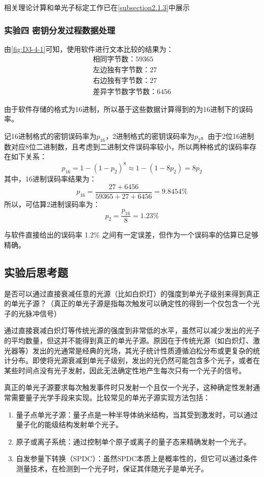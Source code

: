 \documentclass[dvipsnames, svgnames,a4paper,11pt]{article}
\begin{document}
		相关理论计算和单光子标定工作已在\cref{subsection2.1.3}中展示



	\subsubsection{实验四 \quad 密钥分发过程数据处理}


		由\cref{fig:D3-4-1}可知，使用软件进行文本比较的结果为：
			\begin{align}
				\text{相同字节数：} 59365	\nonumber\\
				\text{左边独有字节数：} 27	\nonumber\\
				\text{右边独有字节数：} 27	\nonumber\\
				\text{差异字节数字节数：} 6456	\nonumber
			\end{align}
			
		由于软件存储的格式为16进制，所以基于这些数据计算得到的为16进制下的误码率。

		记16进制格式的密钥误码率为$p_{16}$，2进制格式的密钥误码率为$p_{2}$。由于2位16进制数对应8位二进制数，且考虑到二进制文件误码率较小，所以两种格式的误码率存在如下关系：
		\[
			p_{16} = 1 - (1 - p_{2})^8 \approx 1 - (1 - 8p_{2}) = 8p_{2}
		\]
		其中，16进制误码率结果为：
		\[
			p_{16} = \frac{27 + 6456}{59365 + 27 + 6456} = 9.8454 \%
		\]
		所以，可估算2进制误码率为：
		\[
			p_{2} = \frac{p_{16}}{8} = 1.23 \%
		\]

		与软件直接给出的误码率 1.2\% 之间有一定误差，但作为一个误码率的估算已足够精确。

	
\subsection{实验后思考题}

\begin{question}
	是否可以通过直接衰减任意的光源（比如白炽灯）的强度到单光子级别来得到真正的单光子源？（真正的单光子源是指每次触发可以确定性的得到一个仅包含一个光子的光脉冲信号）
\end{question}

	通过直接衰减白炽灯等传统光源的强度到非常低的水平，虽然可以减少发出的光子的平均数量，但这并不能得到真正的单光子源。原因在于传统光源（如白炽灯、激光器等）发出的光通常是经典的光场，其光子统计性质遵循泊松分布或更复杂的统计分布。即使将光源衰减到单光子级别，发出的光仍然可能包含多个光子，或者在某些时间点没有光子发射，因此无法确定性地产生每次只有一个光子的信号。

	真正的单光子源要求每次触发事件时只发射一个且仅一个光子，这种确定性发射通常需要量子光学手段来实现。比较常见的单光子源实现方法包括：
	\begin{enumerate}
		\item 量子点单光子源：量子点是一种半导体纳米结构，当其受到激发时，可以通过量子化的能级结构发射单个光子。
		\item 原子或离子系统：通过控制单个原子或离子的量子态来精确发射一个光子。
		\item 自发参量下转换（SPDC）：虽然SPDC本质上是概率性的，但它可以通过条件测量技术，在检测到一个光子时，保证其伴随光子是单光子。
	\end{enumerate}
\end{document}
